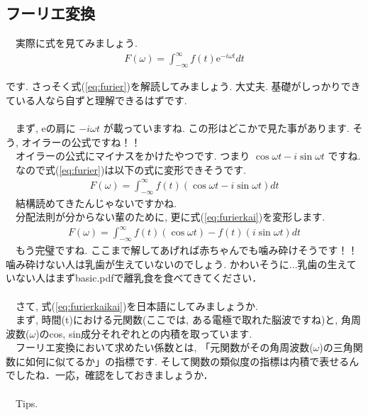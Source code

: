 \documentclass[11pt,a4paper]{ujreport} 	%
\begin{document}
\subsection{フーリエ変換} 
　実際に式を見てみましょう.\\
\begin{eqnarray}
F(\omega) = \int_{-\infty}^{\infty} f(t)\mathrm{e}^{-i\omega t} dt
\label{eq:furier}
\end{eqnarray}

です. さっそく式(\ref{eq:furier})を解読してみましょう. 大丈夫. 基礎がしっかりできている人なら自ずと理解できるはずです.\\
\\
　まず, eの肩に $ -i\omega t $ が載っていますね. この形はどこかで見た事があります. そう, オイラーの公式ですね！！\\
　オイラーの公式にマイナスをかけたやつです. つまり $ \cos\omega t  - i\sin\omega t $ ですね. \\
　なので式(\ref{eq:furier})は以下の式に変形できそうです.\\
\begin{eqnarray}
F(\omega) = \int_{-\infty}^{\infty} f(t)(\cos\omega t - i\sin\omega t) dt
\label{eq:furierkai}
\end{eqnarray}
　結構読めてきたんじゃないですかね.\\
　分配法則が分からない輩のために, 更に式(\ref{eq:furierkai})を変形します.\\
\begin{eqnarray}
F(\omega) = \int_{-\infty}^{\infty} f(t)(\cos\omega t) - f(t)(i\sin\omega t) dt
\label{eq:furierkaikai}
\end{eqnarray}
　もう完璧ですね. ここまで解してあげれば赤ちゃんでも噛み砕けそうです！！噛み砕けない人は乳歯が生えていないのでしょう. かわいそうに...乳歯の生えていない人はまずbasic.pdfで離乳食を食べてきてください．\\
\\
　さて, 式(\ref{eq:furierkaikai})を日本語にしてみましょうか.\\
　まず, 時間(t)における元関数(ここでは, ある電極で取れた脳波ですね)と, 角周波数($\omega$)のcos, sin成分それぞれとの内積を取っています. 
\\
　フーリエ変換において求めたい係数とは, 「元関数がその角周波数($\omega$)の三角関数に如何に似てるか」の指標です. そして関数の類似度の指標は内積で表せるんでしたね．一応，確認をしておきましょうか．\\
\\
　Tips.\\
\end{document}

